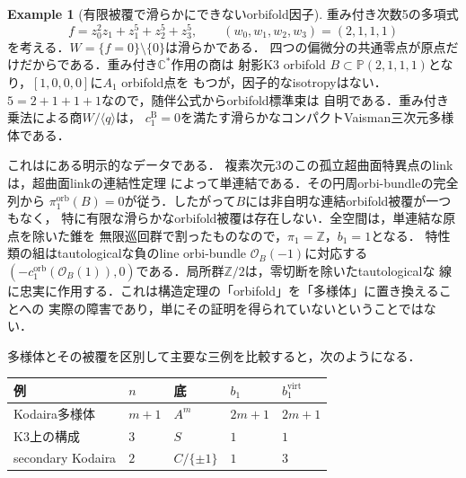 \documentclass[12pt]{amsart}
\theoremstyle{definition}
\newtheorem{eg}[thm]{Example}
\theoremstyle{remark}
\numberwithin{equation}{section}
\newcommand{\cO}{\mathcal{O}}
\newcommand{\orb}{\mathrm{orb}}
\newcommand{\Z}{\mathbb{Z}}
\newcommand{\C}{\mathbb{C}}
\newcommand{\mP}{\mathbb{P}}
\newcommand{\bas}{\mathrm{B}}
\newcommand{\virt}{\mathrm{virt}}
\begin{document}
\begin{eg}[有限被覆で滑らかにできないorbifold因子]\label{eg:orb}
重み付き次数5の多項式
\[
f=z_0^2z_1+z_1^5+z_2^5+z_3^5,
\qquad(w_0,w_1,w_2,w_3)=(2,1,1,1)
\]
を考える．$W=\{f=0\}\setminus\{0\}$は滑らかである．
四つの偏微分の共通零点が原点だけだからである．重み付き$\C^*$作用の商は
射影K3 orbifold $B\subset\mP(2,1,1,1)$となり，$[1,0,0,0]$に$A_1$ orbifold点を
もつが，因子的なisotropyはない．$5=2+1+1+1$なので，随伴公式からorbifold標準束は
自明である．重み付き乗法による商$W/\langle q\rangle$は，
$c_1^{\bas}=0$を満たす滑らかなコンパクトVaisman三次元多様体である．

これは\cite[Example 7.4]{Istrati}にある明示的なデータである．
複素次元3のこの孤立超曲面特異点のlinkは，超曲面linkの連結性定理
\cite[Chapter 5]{Milnor}によって単連結である．その円周orbi-bundleの完全列から
$\pi_1^{\orb}(B)=0$が従う．したがって$B$には非自明な連結orbifold被覆が一つもなく，
特に有限な滑らかなorbifold被覆は存在しない．全空間は，単連結な原点を除いた錐を
無限巡回群で割ったものなので，$\pi_1=\Z$，$b_1=1$となる．
特性類の組はtautologicalな負のline orbi-bundle $\cO_B(-1)$に対応する
$(-c_1^{\orb}(\cO_B(1)),0)$である．局所群$\Z/2$は，零切断を除いたtautologicalな
線に忠実に作用する．これは構造定理の「orbifold」を「多様体」に置き換えることへの
実際の障害であり，単にその証明を得られていないということではない．
\end{eg}

多様体とその被覆を区別して主要な三例を比較すると，次のようになる．
\begin{center}\small
\begin{tabular}{lllll}\toprule
例 & $n$ & 底 & $b_1$ & $b_1^{\virt}$\\\midrule
Kodaira多様体 & $m+1$ & $A^m$ & $2m+1$ & $2m+1$\\
K3上の構成 & $3$ & $S$ & $1$ & $1$\\
secondary Kodaira & $2$ & $C/\{\pm1\}$ & $1$ & $3$\\\bottomrule
\end{tabular}
\end{center}
\end{document}
